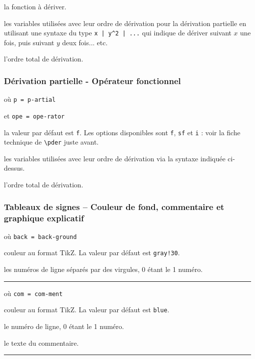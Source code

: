 \documentclass[12pt,a4paper]{article}
\newcommand\env[1]{\texttt{#1}}
\newcommand\macro[1]{\env{\textbackslash{}#1}}
\theoremstyle{definition}
\newcommand\separation{
	\medskip
	\hfill\rule{0.5\textwidth}{0.75pt}\hfill
	\medskip
}
\newcommand\mwhyprefix[2]{%
	\texttt{#1 = #1-#2}%
}
\begin{document}
 la fonction à dériver.

 les variables utilisées avec leur ordre de dérivation pour la dérivation partielle en utilisant une syntaxe du type \verb+x | y^2 | ...+ qui indique de dériver suivant $x$ une fois, puis suivant $y$ deux fois... etc.

 l'ordre total de dérivation.




\subsubsection{Dérivation partielle - Opérateur fonctionnel}

 où \quad \mwhyprefix{p}{artial}
                              et \mwhyprefix{ope}{rator}

\IDoption{} la valeur par défaut est \verb+f+. Les options disponibles sont \verb+f+, \verb+sf+ et \verb+i+ : voir la fiche technique de \macro{pder} juste avant.

 les variables utilisées avec leur ordre de dérivation via la syntaxe indiquée ci-dessus.

 l'ordre total de dérivation.



\subsubsection{Tableaux de signes -- Couleur de fond, commentaire et graphique explicatif}

  où \quad \mwhyprefix{back}{ground}


\IDoption{} couleur au format TikZ.
            La valeur par défaut est \verb+gray!30+.


 les numéros de ligne séparés par des virgules, $0$ étant le 1\ier{} numéro.


\separation


  où \quad \mwhyprefix{com}{ment}


\IDoption{} couleur au format TikZ.
            La valeur par défaut est \verb+blue+.


 le numéro de ligne, $0$ étant le 1\ier{} numéro.

 le texte du commentaire.


\separation


\end{document}
